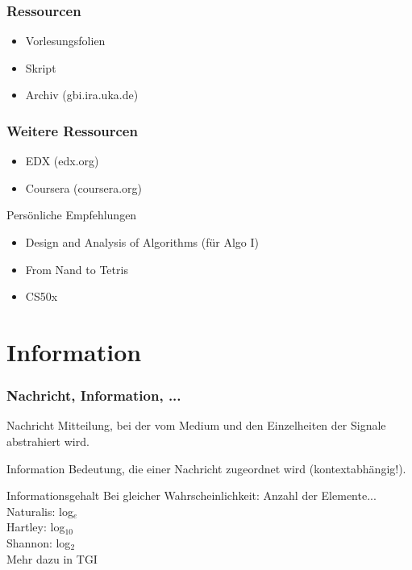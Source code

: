 \begin{frame}
	\frametitle{Ressourcen}
	
	\begin{itemize}
		\item Vorlesungsfolien
		\item Skript
		\item Archiv (gbi.ira.uka.de)
	\end{itemize}
	
\end{frame}


\begin{frame}
	\frametitle{Weitere Ressourcen}
	
	\begin{itemize}
		\item EDX (edx.org)
		\item Coursera (coursera.org)
	\end{itemize}

	\begin{block}{Persönliche Empfehlungen}
		\begin{itemize}
			\item Design and Analysis of Algorithms (für Algo I)
			\item From Nand to Tetris
			\item CS50x
		\end{itemize}
	\end{block}
	
\end{frame}

%

\section{Information}
\begin{frame}
	\frametitle{Nachricht, Information, ...}
	
	\begin{block}{Nachricht}
		      Mitteilung, bei der vom Medium und den Einzelheiten der Signale abstrahiert wird.
	\end{block}
	
	\pause
	\begin{block}{Information}
		      Bedeutung, die einer Nachricht zugeordnet wird (kontextabhängig!).
	\end{block}
	
	\pause
	\begin{block}{Informationsgehalt}
		Bei gleicher Wahrscheinlichkeit: Anzahl der Elemente... \\
		      Naturalis: log$_{e}$ \\
		      Hartley: log$_{10}$ \\
		      Shannon: log$_{2}$ \\[1em]
		Mehr dazu in TGI
	\end{block}

\end{frame}


